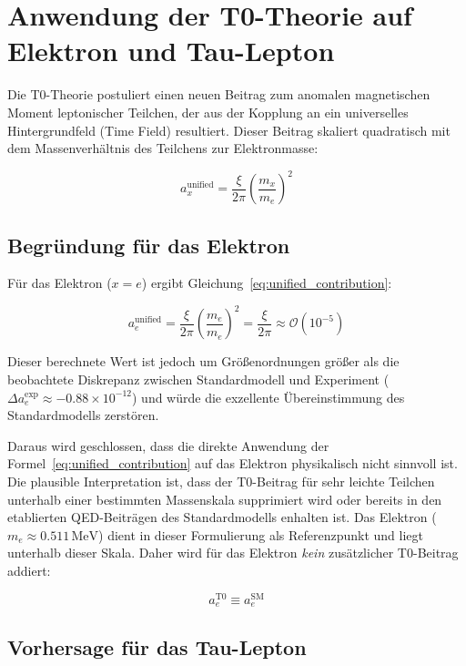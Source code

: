 \documentclass[12pt,a4paper]{article}
\newcommand{\xipar}{\xi}
\begin{document}
	\section{Anwendung der T0-Theorie auf Elektron und Tau-Lepton}
	
	Die T0-Theorie postuliert einen neuen Beitrag zum anomalen magnetischen Moment leptonischer Teilchen, der aus der Kopplung an ein universelles Hintergrundfeld (Time Field) resultiert. Dieser Beitrag skaliert quadratisch mit dem Massenverhältnis des Teilchens zur Elektronmasse:
	
	\begin{equation}
		a_x^{\text{unified}} = \frac{\xipar}{2\pi} \left( \frac{m_x}{m_e} \right)^2
		\label{eq:unified_contribution}
	\end{equation}
	
	\subsection{Begründung für das Elektron}
	
	Für das Elektron (\(x = e\)) ergibt Gleichung~\ref{eq:unified_contribution}:
	
	\[
	a_e^{\text{unified}} = \frac{\xipar}{2\pi} \left( \frac{m_e}{m_e} \right)^2 = \frac{\xipar}{2\pi} \approx \mathcal{O}(10^{-5})
	\]
	
	Dieser berechnete Wert ist jedoch um Größenordnungen größer als die beobachtete Diskrepanz zwischen Standardmodell und Experiment (\(\Delta a_e^{\text{exp}} \approx -0.88 \times 10^{-12}\)) und würde die exzellente Übereinstimmung des Standardmodells zerstören.
	
	Daraus wird geschlossen, dass die direkte Anwendung der Formel~\ref{eq:unified_contribution} auf das Elektron physikalisch nicht sinnvoll ist. Die plausible Interpretation ist, dass der T0-Beitrag für sehr leichte Teilchen unterhalb einer bestimmten Massenskala supprimiert wird oder bereits in den etablierten QED-Beiträgen des Standardmodells enhalten ist. Das Elektron (\(m_e \approx 0.511 \, \text{MeV}\)) dient in dieser Formulierung als Referenzpunkt und liegt unterhalb dieser Skala. Daher wird für das Elektron \textit{kein} zusätzlicher T0-Beitrag addiert:
	
	\[
	a_e^{\text{T0}} \equiv a_e^{\text{SM}}
	\]
	
	\subsection{Vorhersage für das Tau-Lepton}
	
\end{document}

